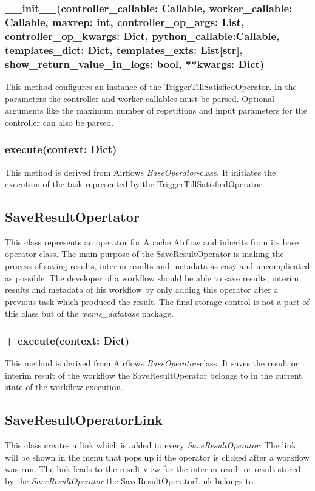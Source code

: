 \subsubsection{\_\_init\_\_(controller\_callable: Callable, worker\_callable: Callable, maxrep: int, controller\_op\_args: List, controller\_op\_kwargs: Dict, python\_callable:Callable,
templates\_dict: Dict, templates\_exts: List[str], show\_return\_value\_in\_logs: bool, **kwargs: Dict)}
This method configures an instance of the TriggerTillSatisfiedOperator. In the parameters the controller and worker callables must be parsed. Optional arguments like the maximum number of repetitions and input parameters for the controller can also be parsed.

\subsubsection{execute(context: Dict)} 
This method is derived from Airflows \textit{BaseOperator}-class. It initiates the execution of the task represented by the TriggerTillSatisfiedOperator.

\subsection{SaveResultOpertator}
This class represents an operator for Apache Airflow and inherits from its base operator class.
The main purpose of the SaveResultOperator is making the process of saving results, interim 
results and metadata as easy and uncomplicated as possible. The developer of a workflow should be able to save
results, interim results and metadata of his workflow by only adding this operator after a previous task 
which produced the result. The final storage control is not a part of this class but of the 
\textit{wams\_database} package.

\subsubsection{+ execute(context: Dict)} 
This method is derived from Airflows \textit{BaseOperator}-class. It saves the result or interim result of the workflow the SaveResultOperator belongs to in the current state of the workflow execution. 

\subsection{SaveResultOperatorLink}
This class creates a link which is added to every \textit{SaveResultOperator}. The link will be shown in the menu that pops up if the operator is clicked after a workflow was run. The link leads to the result view for the interim result or result stored by the \textit{SaveResultOperator} the SaveResultOperatorLink belongs to.

